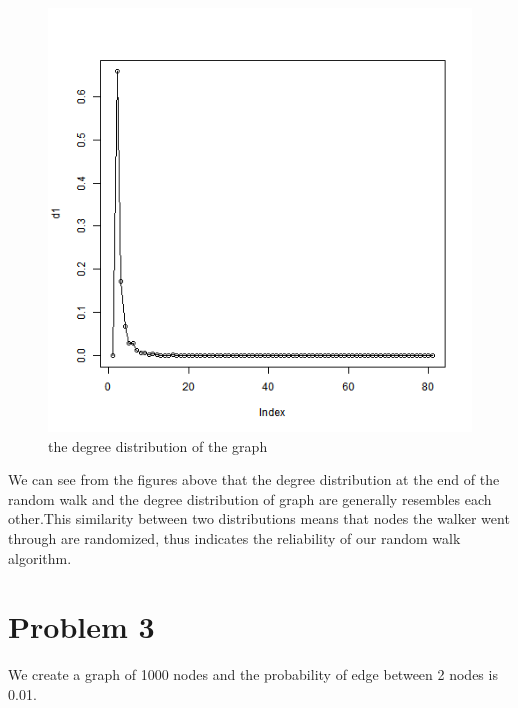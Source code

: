 \documentclass{article}
\begin{document}
\begin{figure}[htbp]
\centering
\includegraphics[width=.6\textwidth]{Q2a_1.png}
\caption{the degree distribution of the graph}
\label{fig:p2_e2}
\end{figure}
\noindent We can see from the figures above that the degree distribution at the end of the random walk and the degree distribution of graph are generally resembles each other.This similarity between two distributions means that nodes the walker went through are randomized, thus indicates the reliability of our random walk algorithm.
\newpage
\section{Problem 3}
We create a graph of 1000 nodes and the probability of edge between 2 nodes is 0.01. 
\end{document}
